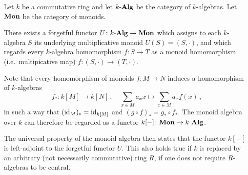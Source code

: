 \begin{remark}
  Let $k$ be a commutative ring and let $k\text{-}\mathbf{Alg}$ be the category of $k$-algebras.
  Let $\mathbf{Mon}$ be the category of monoids.
  
  There exists a forgetful functor $U \colon k\text{-}\mathbf{Alg} \to \mathbf{Mon}$ which assigns to each $k$-algebra $S$ its underlying multiplicative monoid $U(S) = (S, \cdot)$, and which regards every $k$-algebra homomorphism $f \colon S \to T$ as a monoid homomorphism (i.e.\ multipicative map) $f \colon (S, \cdot) \to (T, \cdot)$.
  
  Note that every homomorphism of monoids $f \colon M \to N$ induces a homomorphism of $k$-algebras
  \[
            f_*
    \colon  k[M]
    \to     k[N] \,,
    \quad   \sum_{x \in M} a_x x
    \mapsto \sum_{x \in M} a_x f(x) \,,
  \]
  in such a way that $(\operatorname{id}_M)_* = \operatorname{id}_{k[M]}$ and $(g \circ f)_* = g_* \circ f_*$.
  The monoid algebra over $k$ can therefore be regarded as a functor $k[-] \colon \mathbf{Mon} \to k\text{-}\mathbf{Alg}$.
  
  The universal property of the monoid algebra then states that the functor $k[-]$ is left-adjoint to the forgetful functor $U$.
  This also holds true if $k$ is replaced by an arbitrary (not necessarily commutative) ring $R$, if one does not require $R$-algebras to be central.
\end{remark}




